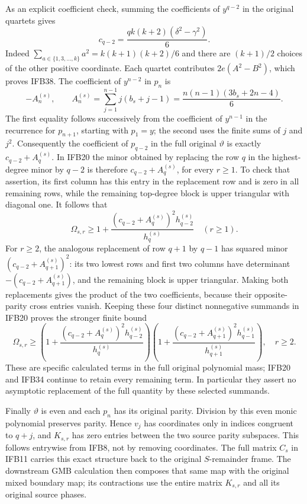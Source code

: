 \documentclass[11pt,a4paper]{article}
\begin{document}
As an explicit coefficient check, summing the coefficients of
$y^{q-2}$ in the original quartets gives
\[
 c_{q-2}=\frac{qk(k+2)(\delta^2-\gamma^2)}6.
 \tag{IFB38}
\]
Indeed $\sum_{a\in\{1,3,\ldots,k\}}a^2=k(k+1)(k+2)/6$ and
there are $(k+1)/2$ choices of the other positive coordinate.
Each quartet contributes $2e(A^2-B^2)$, which proves IFB38.
The coefficient of $y^{n-2}$ in $p_n$ is
\[
 -A_n^{(s)},\qquad
 A_n^{(s)}=\sum_{j=1}^{n-1}j(b_s+j-1)
          =\frac{n(n-1)(3b_s+2n-4)}6.
 \tag{IFB39}
\]
The first equality follows successively from the coefficient of
$y^{n-1}$ in the recurrence for $p_{n+1}$, starting with $p_1=y$;
the second uses the finite sums of $j$ and $j^2$. Consequently
the coefficient of $p_{q-2}$ in the full original $\vartheta$
is exactly $c_{q-2}+A_q^{(s)}$. In IFB20 the minor obtained by
replacing the row $q$ in the highest-degree minor by $q-2$ is
therefore $c_{q-2}+A_q^{(s)}$, for every $r\geq1$.
To check that assertion, its first column has this entry in the
replacement row and is zero in all remaining rows, while the
remaining top-degree block is upper triangular with diagonal one.
It follows that
\[
 \Omega_{s,r}\geq
 1+\frac{(c_{q-2}+A_q^{(s)})^2h_{q-2}^{(s)}}{h_q^{(s)}}
 \quad(r\geq1).
 \tag{IFB40}
\]
For $r\geq2$, the analogous replacement of row $q+1$ by $q-1$
has squared minor $(c_{q-2}+A_{q+1}^{(s)})^2$: its two lowest
rows and first two columns have determinant
$-(c_{q-2}+A_{q+1}^{(s)})$, and the remaining block is upper
triangular. Making both replacements gives the product of the
two coefficients, because their opposite-parity cross entries
vanish. Keeping these four distinct nonnegative summands in
IFB20 proves the stronger finite bound
\[
 \Omega_{s,r}\geq
 \left(1+\frac{(c_{q-2}+A_q^{(s)})^2h_{q-2}^{(s)}}{h_q^{(s)}}\right)
 \left(1+\frac{(c_{q-2}+A_{q+1}^{(s)})^2h_{q-1}^{(s)}}
                         {h_{q+1}^{(s)}}\right),\quad r\geq2.
 \tag{IFB41}
\]
These are specific calculated terms in the full original polynomial
mass; IFB20 and IFB34 continue to retain every remaining term.
In particular they assert no asymptotic replacement of the full
quantity by these selected summands.

Finally $\vartheta$ is even and each $p_n$ has its original parity.
Division by this even monic polynomial preserves parity. Hence
$v_j$ has coordinates only in indices congruent to $q+j$, and
$K_{s,r}$ has zero entries between the two source parity subspaces.
This follows entrywise from IFB8, not by removing coordinates.
The full matrix $C_s$ in IFB11 carries this exact structure back
to the original $S$-remainder frame. The downstream GMB calculation
then composes that same map with the original mixed boundary map;
its contractions use the entire matrix $K_{s,r}$ and all its
original source phases.
\end{document}
